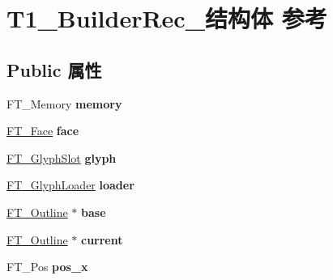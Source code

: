 \hypertarget{struct_t1___builder_rec__}{}\section{T1\+\_\+\+Builder\+Rec\+\_\+结构体 参考}
\label{struct_t1___builder_rec__}
\subsection*{Public 属性}
\begin{DoxyCompactItemize}
\item 
\mbox{\label{struct_t1___builder_rec___abc49339af219c2a6310d16a19d277df3}} 
F\+T\+\_\+\+Memory {\bfseries memory}
\item 
\mbox{\label{struct_t1___builder_rec___a63764b21488527a39316aebeee9f98a2}} 
\hyperlink{struct_f_t___face_rec__}{F\+T\+\_\+\+Face} {\bfseries face}
\item 
\mbox{\label{struct_t1___builder_rec___a2382a6bc2256513f70bf959180f56e4c}} 
\hyperlink{struct_f_t___glyph_slot_rec__}{F\+T\+\_\+\+Glyph\+Slot} {\bfseries glyph}
\item 
\mbox{\label{struct_t1___builder_rec___ae2202eaee7c0937435419d559374bd3c}} 
\hyperlink{struct_f_t___glyph_loader_rec__}{F\+T\+\_\+\+Glyph\+Loader} {\bfseries loader}
\item 
\mbox{\label{struct_t1___builder_rec___a6096f6eba85f91c3ac6dc270d8af464c}} 
\hyperlink{struct_f_t___outline__}{F\+T\+\_\+\+Outline} $\ast$ {\bfseries base}
\item 
\mbox{\label{struct_t1___builder_rec___a6cabaa34c7f020e871a73a1b54371f98}} 
\hyperlink{struct_f_t___outline__}{F\+T\+\_\+\+Outline} $\ast$ {\bfseries current}
\item 
\mbox{\label{struct_t1___builder_rec___ad3e29097d00fa1941ac17273c1310a92}} 
F\+T\+\_\+\+Pos {\bfseries pos\+\_\+x}
\item 
\mbox{\label{struct_t1___builder_rec___ad389bf0d5182b677ed3dba05a9612530}} 

\end{DoxyCompactItemize}
